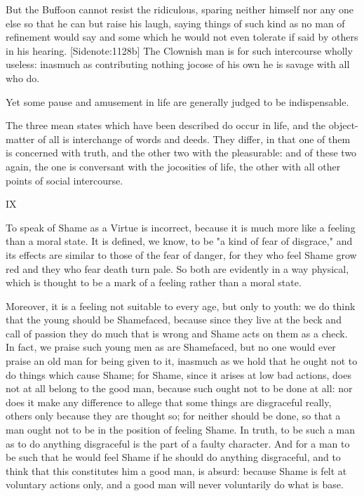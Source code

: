 But the Buffoon cannot resist the ridiculous, sparing neither himself
nor any one else so that he can but raise his laugh, saying things of
such kind as no man of refinement would say and some which he would not
even tolerate if said by others in his hearing. [Sidenote:1128b] The
Clownish man is for such intercourse wholly useless: inasmuch as
contributing nothing jocose of his own he is savage with all who do.

Yet some pause and amusement in life are generally judged to be
indispensable.

The three mean states which have been described do occur in life, and
the object-matter of all is interchange of words and deeds. They differ,
in that one of them is concerned with truth, and the other two with the
pleasurable: and of these two again, the one is conversant with
the jocosities of life, the other with all other points of social
intercourse.

IX

To speak of Shame as a Virtue is incorrect, because it is much more like
a feeling than a moral state. It is defined, we know, to be "a kind of
fear of disgrace," and its effects are similar to those of the fear of
danger, for they who feel Shame grow red and they who fear death turn
pale. So both are evidently in a way physical, which is thought to be a
mark of a feeling rather than a moral state.

Moreover, it is a feeling not suitable to every age, but only to youth:
we do think that the young should be Shamefaced, because since they live
at the beck and call of passion they do much that is wrong and Shame
acts on them as a check. In fact, we praise such young men as are
Shamefaced, but no one would ever praise an old man for being given
to it, inasmuch as we hold that he ought not to do things which cause
Shame; for Shame, since it arises at low bad actions, does not at all
belong to the good man, because such ought not to be done at all: nor
does it make any difference to allege that some things are disgraceful
really, others only because they are thought so; for neither should be
done, so that a man ought not to be in the position of feeling Shame. In
truth, to be such a man as to do anything disgraceful is the part of a
faulty character. And for a man to be such that he would feel Shame if
he should do anything disgraceful, and to think that this constitutes
him a good man, is absurd: because Shame is felt at voluntary actions
only, and a good man will never voluntarily do what is base.

